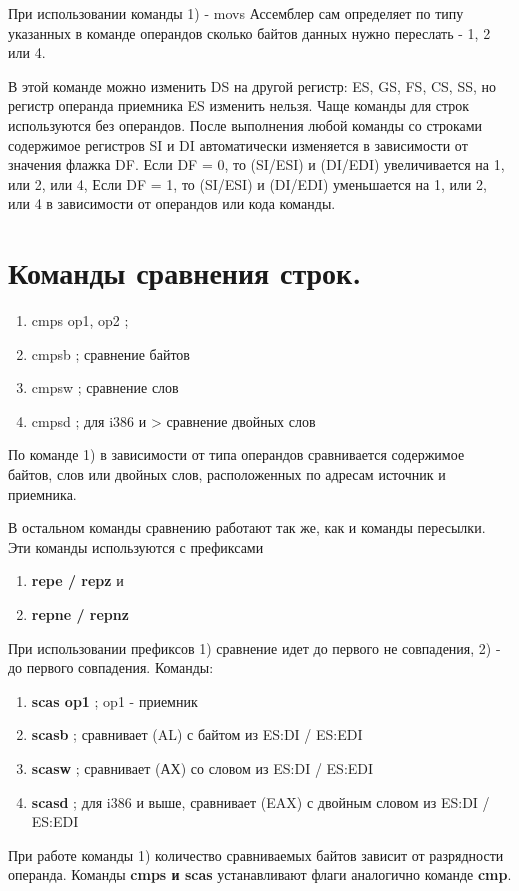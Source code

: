 При использовании команды 1) - movs Ассемблер сам определяет по типу указанных в команде операндов сколько байтов данных нужно переслать - 1, 2 или 4.

В этой команде можно изменить DS на другой регистр: ES, GS, FS, CS, SS, но регистр операнда приемника ES изменить нельзя.
Чаще команды для строк используются без операндов.
После выполнения любой команды со строками содержимое регистров SI и DI автоматически изменяется в зависимости от значения флажка DF.
Если DF = 0, то (SI/ESI) и (DI/EDI) увеличивается на 1, или 2, или 4,
Если DF = 1, то (SI/ESI) и (DI/EDI) уменьшается на 1, или 2, или 4 в зависимости от операндов или кода команды.

\section{Команды сравнения строк.}
\begin{enumerate}
    \item cmps op1, op2 ;
    \item cmpsb ; сравнение байтов
    \item cmpsw ; сравнение слов
    \item cmpsd ; для i386 и > сравнение двойных слов
\end{enumerate}

По команде 1) в зависимости от типа операндов сравнивается содержимое байтов, слов или двойных слов, расположенных по адресам источник и приемника.

В остальном команды сравнению работают так же, как и команды пересылки. Эти команды используются с префиксами
\begin{enumerate}
    \item \textbf{repe / repz} и
    \item \textbf{repne / repnz}
\end{enumerate}
При использовании префиксов 1) сравнение идет до первого не совпадения, 2) - до первого совпадения.
Команды:
\begin{enumerate}
    \item \textbf{scas op1} ; op1 - приемник
    \item \textbf{scasb} ; сравнивает (AL) с байтом из ES:DI / ES:EDI
    \item \textbf{scasw} ; сравнивает (АХ) со словом из ES:DI / ES:EDI
    \item \textbf{scasd} ; для i386 и выше, сравнивает (EAX) с двойным словом из ES:DI / ES:EDI
\end{enumerate}
При работе команды 1) количество сравниваемых байтов зависит от разрядности операнда.
Команды \textbf{cmps и scas} устанавливают флаги аналогично команде \textbf{cmp}.

